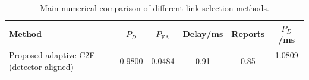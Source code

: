 \begin{table}[t]
    \centering
    \caption{Main numerical comparison of different link selection methods.}
    \label{tab:main_summary}
    \begin{tabular}{l c c c c c}
        \hline
        Method & $P_D$ & $P_{\mathrm{FA}}$ & Delay/ms & Reports & $P_D$/ms \\
        \hline
        Proposed adaptive C2F (detector-aligned) & 0.9800 & 0.0484 & 0.91 & 0.85 & 1.0809 \
        \hline
    \end{tabular}
\end{table}
